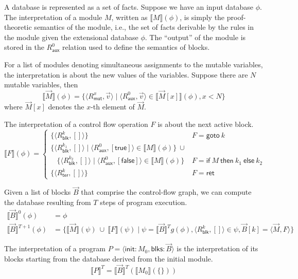 \documentclass[11pt]{article}
\newcommand{\fgoto}[1]{\textsf{goto}~#1}
\newcommand{\fif}[3]{\textsf{if}~#1~\textsf{then}~#2~\textsf{else}~#3}
\newcommand{\fret}{\textsf{ret}}
\newcommand{\mut}{\textsf{mut}}
\newcommand{\blk}{\textsf{blk}}
\newcommand{\ter}{\textsf{ter}}
\newcommand{\aux}{\textsf{aux}}
\newcommand{\btrue}{\textsf{true}}
\newcommand{\bfalse}{\textsf{false}}
\newcommand{\blks}{\textsf{blks}}
\newcommand{\init}{\textsf{init}}
\begin{document}
A database is represented as a set of facts.
Suppose we have an input database $\phi$.
The interpretation of a module $M$, written as $\llbracket M \rrbracket(\phi)$, is simply the proof-theoretic semantics of the module, i.e., the set of facts derivable by the rules in the module given the extensional database $\phi$.
The ``output'' of the module is stored in the $R_{\aux}^0$ relation used to define the semantics of blocks.

For a list of modules denoting simultaneous assignments to the mutable variables, the interpretation is about the new values of the variables.
Suppose there are $N$ mutable variables, then
\[
\llbracket \vec{M} \rrbracket(\phi) = \{ \langle R_{\mut{}}^x, \vec{v} \rangle \mid \langle R_{\aux{}}^0, \vec{v} \rangle \in \llbracket \vec{M}[x] \rrbracket(\phi), x < N \}
\]
where $\vec{M}[x]$ denotes the $x$-th element of $\vec{M}$.

The interpretation of a control flow operation $F$ is about the next active block.
\[
\llbracket F \rrbracket(\phi) =
\begin{cases}
   \{ \langle R_{\blk{}}^k, [] \rangle \} & F = \fgoto{k} \\
   \{ \langle R_{\blk{}}^{k_1}, [] \rangle \mid \langle R_{\aux{}}^0, [\btrue] \rangle \in \llbracket M \rrbracket(\phi) \} ~\cup & \\
   \ \ \ \ \{ \langle R_{\blk{}}^{k_2}, [] \rangle \mid \langle R_{\aux{}}^0, [\bfalse] \rangle \in \llbracket M \rrbracket(\phi) \}
   & F = \fif{M}{k_1}{k_2} \\
   \{ \langle R_{\ter{}}^k, [] \rangle \} & F = \fret{}
\end{cases}
\]

Given a list of blocks $\vec{B}$ that comprise the control-flow graph, we can compute the database resulting from $T$ steps of program execution.
\[
\begin{aligned}
\llbracket \vec{B} \rrbracket^0(\phi) & = \phi\\
\llbracket \vec{B} \rrbracket^{T+1}(\phi) & =
\{
\llbracket \vec{M} \rrbracket(\psi) ~\cup~ \llbracket F \rrbracket(\psi)
\mid \psi = \llbracket \vec{B} \rrbracket^Tg(\phi), \langle R_{\blk{}}^k, [] \rangle \in \psi, \vec{B}[k] = \langle \vec{M}, F \rangle
\}
\end{aligned}
\]

The interpretation of a program $P = \langle \init{}: M_0, \blks{}: \vec{B} \rangle$ is the interpretation of its blocks starting from the database derived from the initial module.
\[ \llbracket P \rrbracket^T = \llbracket \vec{B} \rrbracket^T(\llbracket M_0 \rrbracket(\{\})) \]
\end{document}
